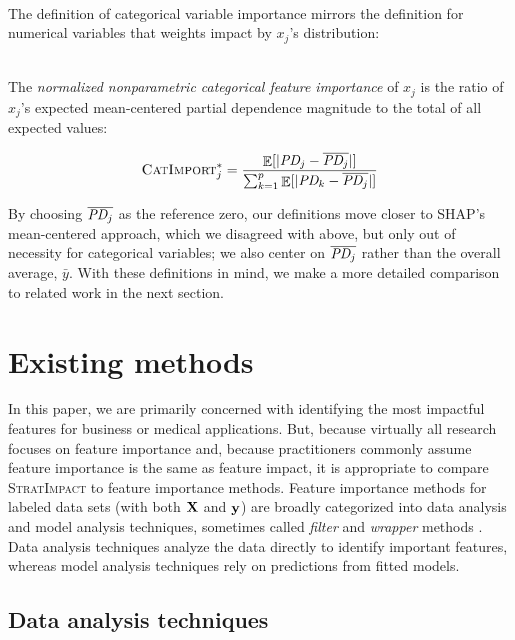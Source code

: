 \documentclass[11pt]{article}
\DeclareMathOperator{\Ex}{\mathbb{E}}
\newcommand{\CImpo}{\fontfamily{cmr}\textsc{CatImport}}
\newcommand{\simp}{\fontfamily{cmr}\textsc{\small StratImpact}}
\begin{document}
~\\

\noindent The definition of categorical variable importance mirrors the definition for numerical variables that weights impact by $x_j$'s distribution:

~\\

 The {\em normalized nonparametric categorical feature importance} of $x_j$ is the ratio of $x_j$'s expected mean-centered partial dependence magnitude to the total of all expected values:

\begin{equation}\label{eq:Epd2b}
\CImpo_j^{*} = \frac{\Ex[|\text{\it PD}_j - \overline{\text{\it PD}_j}|]}{\sum_{k=1}^p \Ex[|\text{\it PD}_k - \overline{\text{\it PD}_j}|]}
\end{equation}

By choosing $\overline{\text{\it PD}_j}$ as the reference zero, our definitions move closer to SHAP's mean-centered approach, which we disagreed with above, but only out of necessity for categorical variables; we also center on $\overline{\text{\it PD}_j}$ rather than the overall average, $\bar{y}$. With these definitions in mind, we make a more detailed comparison to related work in the next section.

\section{Existing methods}\label{sec:existing}

In this paper, we are primarily concerned with identifying the most impactful features for business or medical applications. But, because virtually all research focuses on feature importance and, because practitioners commonly assume feature importance is the same as feature impact, it is appropriate to compare \simp{} to  feature importance methods. Feature importance methods for labeled data sets (with both $\bf X$ and $\bf y$) are broadly categorized into data analysis and model analysis techniques, sometimes called {\em filter} and {\em wrapper} methods \citep{tsanas}. Data analysis techniques analyze the data directly to identify important features, whereas model analysis techniques rely on predictions from fitted models.

\subsection{Data analysis techniques}
\end{document}
